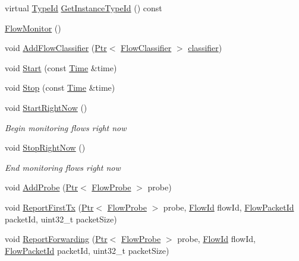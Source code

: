 \begin{DoxyCompactItemize}
\item 
virtual \hyperlink{classns3_1_1TypeId}{Type\+Id} \hyperlink{classns3_1_1FlowMonitor_ad771de12865a32403272e0916ab27a34}{Get\+Instance\+Type\+Id} () const 
\item 
\hyperlink{classns3_1_1FlowMonitor_a1d8f90827a1d9686cde7195e8fb32bf8}{Flow\+Monitor} ()
\item 
void \hyperlink{classns3_1_1FlowMonitor_a5090ae6a29222cf5a61e6b6b95027ac3}{Add\+Flow\+Classifier} (\hyperlink{classns3_1_1Ptr}{Ptr}$<$ \hyperlink{classns3_1_1FlowClassifier}{Flow\+Classifier} $>$ \hyperlink{design_8txt_af9e6b398b148789960232a87c72a107e}{classifier})
\item 
void \hyperlink{classns3_1_1FlowMonitor_a32cb7ddc6d0956518a59f7ed91de7f6d}{Start} (const \hyperlink{classns3_1_1Time}{Time} \&time)
\item 
void \hyperlink{classns3_1_1FlowMonitor_a8b6fba3b1978adf6747189d7b2a3d2cc}{Stop} (const \hyperlink{classns3_1_1Time}{Time} \&time)
\item 
void \hyperlink{classns3_1_1FlowMonitor_acba0f7577c14fff980de4a343d463337}{Start\+Right\+Now} ()
\begin{DoxyCompactList}\small\item\em Begin monitoring flows {\itshape right now} \end{DoxyCompactList}\item 
void \hyperlink{classns3_1_1FlowMonitor_a0b1af9443f39d65e32ed8c2cf654711a}{Stop\+Right\+Now} ()
\begin{DoxyCompactList}\small\item\em End monitoring flows {\itshape right now} \end{DoxyCompactList}\item 
void \hyperlink{classns3_1_1FlowMonitor_a63f71e31409b6d7241a2b157b8c0e9b6}{Add\+Probe} (\hyperlink{classns3_1_1Ptr}{Ptr}$<$ \hyperlink{classns3_1_1FlowProbe}{Flow\+Probe} $>$ probe)
\item 
void \hyperlink{classns3_1_1FlowMonitor_ad115f00ce726f14fd73f087d13f95313}{Report\+First\+Tx} (\hyperlink{classns3_1_1Ptr}{Ptr}$<$ \hyperlink{classns3_1_1FlowProbe}{Flow\+Probe} $>$ probe, \hyperlink{group__flow-monitor_ga39a766c4a370cdb9ab8ac85da4b288e9}{Flow\+Id} flow\+Id, \hyperlink{group__flow-monitor_gaa1cb18250e1672975204f1254b8aa2ae}{Flow\+Packet\+Id} packet\+Id, uint32\+\_\+t packet\+Size)
\item 
void \hyperlink{classns3_1_1FlowMonitor_a69a7483c4d2bc47805490f585d17e111}{Report\+Forwarding} (\hyperlink{classns3_1_1Ptr}{Ptr}$<$ \hyperlink{classns3_1_1FlowProbe}{Flow\+Probe} $>$ probe, \hyperlink{group__flow-monitor_ga39a766c4a370cdb9ab8ac85da4b288e9}{Flow\+Id} flow\+Id, \hyperlink{group__flow-monitor_gaa1cb18250e1672975204f1254b8aa2ae}{Flow\+Packet\+Id} packet\+Id, uint32\+\_\+t packet\+Size)

\end{DoxyCompactItemize}
